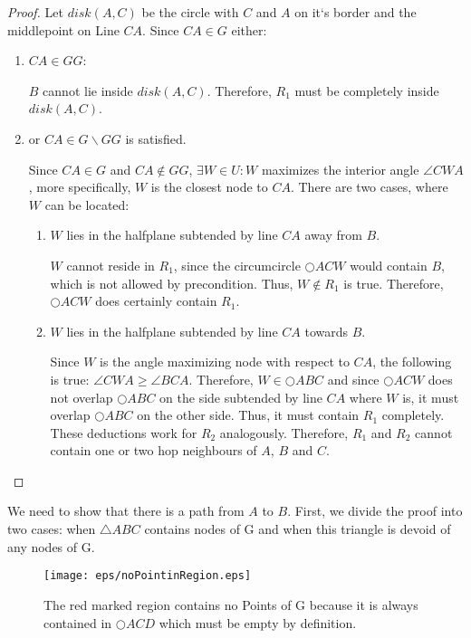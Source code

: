 \begin{proof}
Let $disk(A, C) $ be the circle with $C $ and $A $ on it`s border and the middlepoint on Line $CA $.
Since $CA \in G $ either: 
\begin{enumerate}
\renewcommand{\labelenumi}{(\roman{enumi})}
\item $CA \in GG $:

$B $ cannot lie inside $disk(A, C) $. 
Therefore, $R_1 $ must be completely inside $disk(A, C) $.
\item or $CA \in G\backslash GG $ is satisfied. 

Since $CA \in G $ and $CA \notin GG $, $\exists W\in U : W$ maximizes the interior angle $\angle{CWA}  $, more specifically, $W $ is the closest node to $CA $.
There are two cases, where $W $ can be located:
\begin{enumerate}
\renewcommand{\labelenumi}{(\alph{enumi})}
\item $W $ lies in the halfplane subtended by line $CA $ away from $B $.

$W $ cannot reside in $R_1 $, since the circumcircle $\bigcirc{ACW} $ would contain $B $, which is not allowed by precondition.
Thus, $W \notin R_1 $ is true.
Therefore, $\bigcirc{ACW} $ does certainly contain $R_1 $.

\item $W $ lies in the halfplane subtended by line $CA $ towards $B $.

Since $W $ is the angle maximizing node with respect to $CA $, the following is true: $\angle{CWA} \geq \angle{BCA} $.
Therefore, $W \in \bigcirc{ABC} $ and since $\bigcirc{ACW} $ does not overlap $\bigcirc{ABC} $ on the side subtended by line $CA $ where $W $ is, it must overlap $\bigcirc{ABC} $ on the other side.
Thus, it must contain $R_1 $ completely.
These deductions work for $R_2 $ analogously.
Therefore, $R_1 $ and $R_2 $ cannot contain one or two hop neighbours of $A $, $B $ and $C $. 


\end{enumerate} 


\end{enumerate}


\end{proof} 



We need to show that there is a path from $A $ to $B $.
First, we divide the proof into two cases: when $\triangle{ABC} $ contains nodes of G and when this triangle is devoid of any nodes of G.
\begin{figure}[h!]
\centering
\texttt{[image: eps/noPointinRegion.eps]}
\caption{The red marked region contains no Points of G because it is always contained in $\bigcirc{ACD} $ which must be empty by definition.}
\label{fig:empty_region}
\end{figure}

